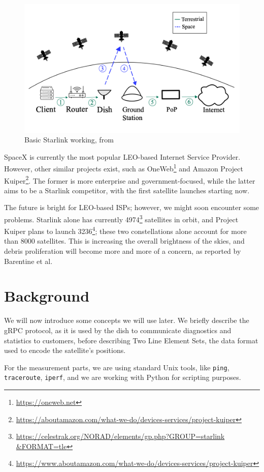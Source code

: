 \documentclass[]{report}
\begin{document}
\begin{figure}
    \centering
    \includegraphics[width=0.6\columnwidth]{img/starlink-101.png}
    \caption{Basic Starlink working, from \cite{izhikevich2023democratizing}}
    \label{fig:starlink-101}
\end{figure}      
    
SpaceX is currently the most popular LEO-based Internet Service Provider. However, other similar projects exist, such as
OneWeb\footnote{\url{https://oneweb.net}} and Amazon Project
Kuiper\footnote{\url{https://aboutamazon.com/what-we-do/devices-services/project-kuiper}}. The former is more enterprise
and government-focused, while the latter aims to be a Starlink competitor, with the first satellite launches starting
now.

The future is bright for LEO-based ISPs; however, we might soon encounter some problems. Starlink alone has currently
4974\footnote{\url{https://celestrak.org/NORAD/elements/gp.php?GROUP=starlink &FORMAT=tle}} satellites in orbit, and
Project Kuiper plans to launch
3236\footnote{\url{https://www.aboutamazon.com/what-we-do/devices-services/project-kuiper}}; these two constellations
alone account for more than 8000 satellites. This is increasing the overall brightness of the skies, and debris
proliferation will become more and more of a concern, as reported by Barentine et al. \cite{cite-key}
    
\section{Background}

We will now introduce some concepts we will use later. We briefly describe the gRPC protocol, as it is used by the dish
to communicate diagnostics and statistics to customers, before describing Two Line Element Sets, the data format used to
encode the satellite's positions. 

For the measurement parts, we are using standard Unix tools, like \texttt{ping}, \texttt{traceroute}, \texttt{iperf},
and we are working with Python for scripting purposes.
\end{document}
